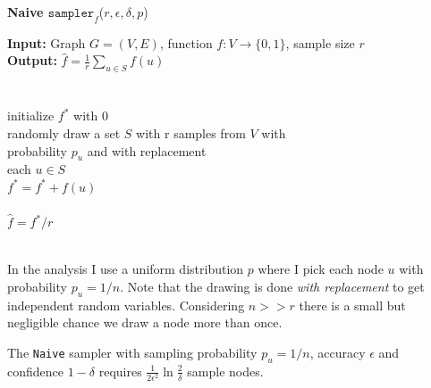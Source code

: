 \begin{algorithm*}[!htb]
  \caption{\small {\bf Naive $\texttt{sampler}_f$}($r, \epsilon, \delta, p$)}
  \begin{code}
  {\bf Input:} Graph $G=(V,E)$, function $f : V \rightarrow \{0,1\}$, sample size $r$ \\
  {\bf Output:} $\hat{f}=\frac{1}{r}\sum\nolimits_{u\in S} f(u)$\\
  \\
  \uln \>\ubegin\\
  \uln \>\>initialize $f^*$ with 0 \\
  \uln \>\>randomly draw a set $S$ with r samples from $V$ with\\
  \>\>\>\>probability $p_u$ and with replacement\\
  \uln \>\>\ufor each $u \in S$ \udo\\
  \uln \>\>\>$f^* = f^* + f(u)$ \\
  \uln \>\>\uend\\
  \uln \>\ureturn $\hat{f} = f^*/r$ \\
  \uln \>\uend\\ 
  \end{code}
  \label{algnaive}
\end{algorithm*}
In the analysis I use a uniform distribution $p$ where I pick each node $u$ with probability $p_u = 1/n$. Note that the drawing is done \textit{with replacement} to get independent random variables. Considering $n >> r$ there is a small but negligible chance we draw a node more than once.
\begin{theorem}
  The \texttt{Naive} sampler with sampling probability $p_u = 1/n$, accuracy $\epsilon$ and confidence $1-\delta$ requires $\frac{1}{2\epsilon^2}\ln{\frac{2}{\delta}}$ sample nodes.
\end{theorem}
